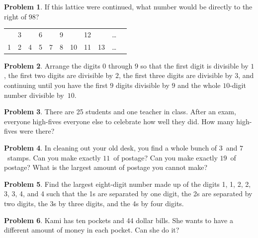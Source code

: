 \documentclass[10pt, reqno]{amsart}
\theoremstyle{remark}
\theoremstyle{definition}
\newtheorem{problem}{Problem}
\numberwithin{equation}{section}  %
\begin{document}
\begin{problem}
If this lattice were continued, what number would be directly to the right of $98$?
\begin{center}
\begin{tabular}{c c c c c c c c c c c}
& 3 &  & 6 &  & 9 &  & 12 & &\ldots \\
1 & 2& 4&  5 & 7 & 8 & 10 & 11 & 13 & \ldots  \\
\end{tabular}
\end{center}

\end{problem}





\begin{problem}
Arrange the digits $0$ through $9$ so that the first digit is divisible by $1$, the first two digits are divisible by $2$, the first three digits are divisible by $3$, and continuing until you have the first $9$ digits divisible by $9$ and the whole $10$-digit number divisible by~$10$.
\end{problem}

\begin{problem}
There are 25 students and one teacher in class.  After an exam, everyone high-fives everyone else to celebrate how well they did.  How many high-fives were there?
\end{problem}




\begin{problem}
In cleaning out your old desk, you find a whole bunch of $3$\textcent\ and $7$\textcent\ stamps.  Can you make exactly $11$\textcent\ of postage?  Can you make exactly $19$\textcent\ of postage?  What is the largest amount of postage you cannot make?  
\end{problem}


\begin{problem}
Find the largest eight-digit number made up of the digits 1, 1, 2, 2, 3, 3, 4, and 4 such that the 1s are separated by one digit, the 2s are separated by two digits, the 3s by three digits, and the 4s by four digits.
\end{problem}



\begin{problem}
Kami has ten pockets and 44 dollar bills.  She wants to have a different amount of money in each pocket.  Can she do it?
\end{problem}
\end{document}
